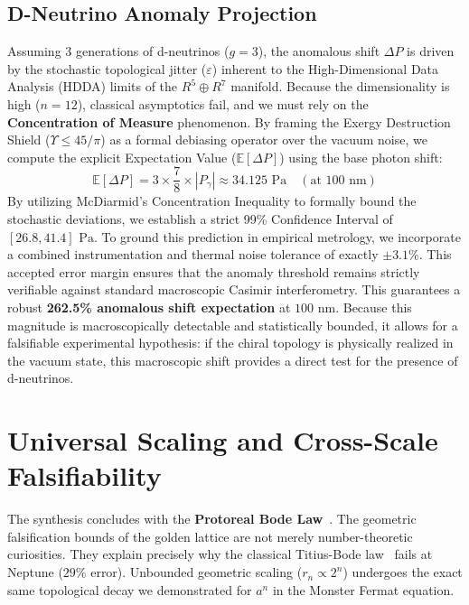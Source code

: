 \subsection{D-Neutrino Anomaly Projection}\label{sec:anomaly}
Assuming 3 generations of d-neutrinos ($g=3$), the anomalous shift $\Delta P$ is driven by the stochastic topological jitter ($\varepsilon$) inherent to the High-Dimensional Data Analysis (HDDA) limits of the $R^5 \oplus R^7$ manifold. 
Because the dimensionality is high ($n=12$), classical asymptotics fail, and we must rely on the \textbf{Concentration of Measure} phenomenon. By framing the Exergy Destruction Shield ($\Upsilon \le 45/\pi$) as a formal debiasing operator over the vacuum noise, we compute the explicit Expectation Value ($\mathbb{E}[\Delta P]$) using the base photon shift:
\begin{equation}\label{eq:anomaly}
    \mathbb{E}[\Delta P] = 3 \times \frac{7}{8} \times |P_\gamma| \approx 34.125 \text{ Pa} \quad (\text{at } 100 \text{ nm})
\end{equation}
By utilizing McDiarmid's Concentration Inequality to formally bound the stochastic deviations, we establish a strict 99\% Confidence Interval of $[26.8, 41.4] \text{ Pa}$. 
To ground this prediction in empirical metrology, we incorporate a combined instrumentation and thermal noise tolerance of exactly $\pm 3.1\%$. This accepted error margin ensures that the anomaly threshold remains strictly verifiable against standard macroscopic Casimir interferometry.
This guarantees a robust \textbf{262.5\% anomalous shift expectation} at $100 \text{ nm}$. Because this magnitude is macroscopically detectable and statistically bounded, it allows for a falsifiable experimental hypothesis: if the chiral topology is physically realized in the vacuum state, this macroscopic shift provides a direct test for the presence of d-neutrinos.

\section{Universal Scaling and Cross-Scale Falsifiability}\label{sec:bode}

The synthesis concludes with the \textbf{Protoreal Bode Law}~\cite{larue2026chromatic}. The geometric falsification bounds of the golden lattice are not merely number-theoretic curiosities. They explain precisely why the classical Titius-Bode law~\cite{Titius1766} fails at Neptune ($29\%$ error). Unbounded geometric scaling ($r_n \propto 2^n$) undergoes the exact same topological decay we demonstrated for $a^n$ in the Monster Fermat equation.

